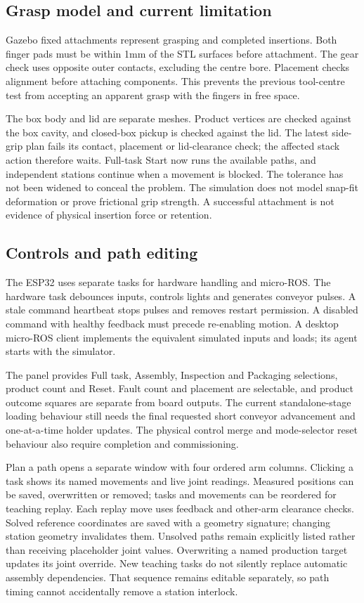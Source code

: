 \documentclass{article}
\begin{document}
\subsection{Grasp model and current limitation}
Gazebo fixed attachments represent grasping and completed insertions. Both finger pads must be within 1mm of the STL surfaces before attachment. The gear check uses opposite outer contacts, excluding the centre bore. Placement checks alignment before attaching components. This prevents the previous tool-centre test from accepting an apparent grasp with the fingers in free space.

The box body and lid are separate meshes. Product vertices are checked against the box cavity, and closed-box pickup is checked against the lid. The latest side-grip plan fails its contact, placement or lid-clearance check; the affected stack action therefore waits. Full-task Start now runs the available paths, and independent stations continue when a movement is blocked. The tolerance has not been widened to conceal the problem. The simulation does not model snap-fit deformation or prove frictional grip strength. A successful attachment is not evidence of physical insertion force or retention.

\subsection{Controls and path editing}
The ESP32 uses separate tasks for hardware handling and micro-ROS. The hardware task debounces inputs, controls lights and generates conveyor pulses. A stale command heartbeat stops pulses and removes restart permission. A disabled command with healthy feedback must precede re-enabling motion. A desktop micro-ROS client implements the equivalent simulated inputs and loads; its agent starts with the simulator.

The panel provides Full task, Assembly, Inspection and Packaging selections, product count and Reset. Fault count and placement are selectable, and product outcome squares are separate from board outputs. The current standalone-stage loading behaviour still needs the final requested short conveyor advancement and one-at-a-time holder updates. The physical control merge and mode-selector reset behaviour also require completion and commissioning.

Plan a path opens a separate window with four ordered arm columns. Clicking a task shows its named movements and live joint readings. Measured positions can be saved, overwritten or removed; tasks and movements can be reordered for teaching replay. Each replay move uses feedback and other-arm clearance checks. Solved reference coordinates are saved with a geometry signature; changing station geometry invalidates them. Unsolved paths remain explicitly listed rather than receiving placeholder joint values. Overwriting a named production target updates its joint override. New teaching tasks do not silently replace automatic assembly dependencies. That sequence remains editable separately, so path timing cannot accidentally remove a station interlock.
\end{document}

